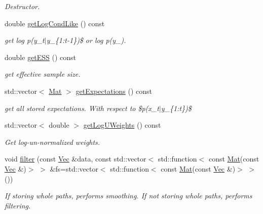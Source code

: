 \begin{DoxyCompactItemize}
\begin{DoxyCompactList}\small\item\em Destructor. \end{DoxyCompactList}\item 
double \hyperlink{classBSFilter_a1e3791db4cea7b21a6cb135220823cc2}{get\+Log\+Cond\+Like} () const 
\begin{DoxyCompactList}\small\item\em get log p(y\+\_\+t$\vert$y\+\_\+\{1\+:t-\/1\})\$ or log p(y\+\_). \end{DoxyCompactList}\item 
double \hyperlink{classBSFilter_ade1e772ec74f4cf3ffaea84d466f26cc}{get\+E\+SS} () const 
\begin{DoxyCompactList}\small\item\em get effective sample size. \end{DoxyCompactList}\item 
std\+::vector$<$ \hyperlink{apf__filter_8h_ae601f56a556993079f730483c574356f}{Mat} $>$ \hyperlink{classBSFilter_a8e591e267bdaf681062ee11486acd88a}{get\+Expectations} () const 
\begin{DoxyCompactList}\small\item\em get all stored expectations. With respect to \$p(x\+\_\+t$\vert$y\+\_\+\{1\+:t\})\$ \end{DoxyCompactList}\item 
std\+::vector$<$ double $>$ \hyperlink{classBSFilter_a80aa1183f38d12b3a180ab6a143ab4fd}{get\+Log\+U\+Weights} () const 
\begin{DoxyCompactList}\small\item\em Get log-\/un-\/normalized weights. \end{DoxyCompactList}\item 
void \hyperlink{classBSFilter_ac3040c97a24838736e479ac4af219562}{filter} (const \hyperlink{apf__filter_8h_a4c7df05c6f5e8a0d15ae14bcdbc07152}{Vec} \&data, const std\+::vector$<$ std\+::function$<$ const \hyperlink{apf__filter_8h_ae601f56a556993079f730483c574356f}{Mat}(const \hyperlink{apf__filter_8h_a4c7df05c6f5e8a0d15ae14bcdbc07152}{Vec} \&)$>$ $>$ \&fs=std\+::vector$<$ std\+::function$<$ const \hyperlink{apf__filter_8h_ae601f56a556993079f730483c574356f}{Mat}(const \hyperlink{apf__filter_8h_a4c7df05c6f5e8a0d15ae14bcdbc07152}{Vec} \&)$>$ $>$())
\begin{DoxyCompactList}\small\item\em If storing whole paths, performs smoothing. If not storing whole paths, performs filtering. \end{DoxyCompactList}\item 

\end{DoxyCompactItemize}
